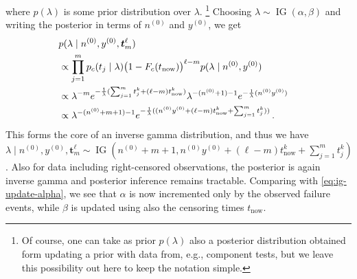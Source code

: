 \documentclass[12pt,a4paper,twocolumn,fleqn]{narms}
\renewcommand{\vec}[1]{{\bm#1}}
\newcommand{\uz}{^{(0)}} %
\newcommand{\ig}{\operatorname{IG}}   %
\def\yz{y\uz}
\def\nz{n\uz}
\begin{document}
where $p(\lambda)$ is some prior distribution over $\lambda$.%
\footnote{Of course, one can take as prior $p(\lambda)$ also a posterior distribution
obtained form updating a prior with data from, e.g., component tests,
but we leave this possibility out here to keep the notation simple.}
%
Choosing $\lambda \sim \ig(\alpha,\beta)$ and writing the posterior in terms of $\nz$ and $\yz$, we get
\begin{align}
\lefteqn{p(\lambda \mid \nz, \yz, \vec{t}_m^\ell)} \\
	&\propto \prod_{j=1}^{m} p_c(t_j \mid \lambda) \big(1 - F_c(t_\text{now})\big)^{\ell-m} p(\lambda\mid \nz, \yz) \\
	&\propto \lambda^{-m} e^{-\frac{1}{\lambda}(\sum_{j=1}^{m} t_j^k + (\ell-m) t_\text{now}^k)}
           \lambda^{-(\nz+1)-1}   e^{-\frac{1}{\lambda}(\nz \yz)} \\
	&\propto \lambda^{-(\nz+m+1)-1} e^{-\frac{1}{\lambda}((\nz \yz + (\ell-m) t_\text{now}^k + \sum_{j=1}^{m} t_j^k))} \,.
\end{align}
This forms the core of an inverse gamma distribution, and thus we have
$\lambda \mid \nz, \yz, \vec{t}_m^\ell \sim \ig\left(\nz + m + 1, \nz \yz + (\ell-m) t_\text{now}^k + \sum_{j=1}^{m}t_j^k \right)$.
Also for data including right-censored observations,
the posterior is again inverse gamma and posterior inference remains tractable.
Comparing with \eqref{eq:ig-update-alpha},
we see that $\alpha$ is now incremented only by the observed failure events,
while $\beta$ is updated using also the censoring times $t_\text{now}$.
\end{document}
